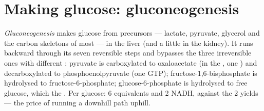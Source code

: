 \section{Making glucose: gluconeogenesis}

\begin{definition}[Gluconeogenesis]\label{def:b1:biosyntheses-integration:gluconeogenesis}
\emph{Gluconeogenesis} makes glucose from  precursors
--- lactate, pyruvate, glycerol and the carbon skeletons of most  --- in the liver (and a little in the kidney). It runs 
backward through its seven reversible steps and bypasses the three
irreversible ones with different : pyruvate is carboxylated to
oxaloacetate (in the , one ) and decarboxylated to
phosphoenolpyruvate (one GTP); fructose-1,6-bisphosphate is
hydrolysed to fructose-6-phosphate; glucose-6-phosphate is
hydrolysed to free glucose, which  the . Per glucose: 6 
equivalents and 2 NADH, against the 2   yields --- the
price of running a downhill path uphill.
\end{definition}

